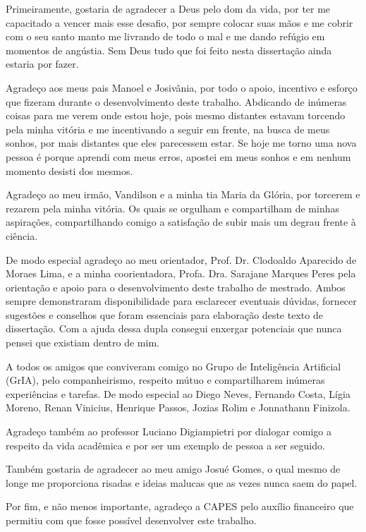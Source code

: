 \begin{agradecimentos} %

Primeiramente, gostaria de agradecer a Deus pelo dom da vida, por ter me capacitado a vencer mais esse desafio, por sempre colocar suas mãos e me cobrir com o seu santo manto me livrando de todo o mal e me dando refúgio em momentos de angústia. Sem Deus tudo que foi feito nesta dissertação ainda estaria por fazer. 

Agradeço aos meus pais Manoel e Josivânia, por todo o apoio, incentivo e esforço que fizeram durante o desenvolvimento deste trabalho. Abdicando de inúmeras coisas para me verem onde estou hoje, pois mesmo distantes estavam torcendo pela minha vitória e me incentivando a seguir em frente, na busca de meus sonhos, por mais distantes que eles parecessem estar. Se hoje me torno uma nova pessoa é porque aprendi com meus erros, apostei em meus sonhos e em nenhum momento desisti dos mesmos.

Agradeço ao meu irmão, Vandilson e a minha tia Maria da Glória, por torcerem e rezarem pela minha vitória. Os quais se orgulham e compartilham de minhas aspirações, compartilhando comigo a satisfação de subir mais um degrau frente à ciência.

De modo especial agradeço ao meu orientador, Prof. Dr. Clodoaldo Aparecido de Moraes Lima, e a minha coorientadora, Profa. Dra. Sarajane Marques Peres pela orientação e apoio para o desenvolvimento deste trabalho de mestrado. Ambos sempre demonstraram disponibilidade para esclarecer eventuais dúvidas, fornecer sugestões e conselhos que foram essenciais para elaboração deste texto de dissertação. Com a ajuda dessa dupla consegui enxergar potenciais que nunca pensei que existiam dentro de mim.

A todos os amigos que conviveram comigo no Grupo de Inteligência Artificial (GrIA), pelo companheirismo, respeito mútuo e compartilharem inúmeras experiências e tarefas. De modo especial ao Diego Neves, Fernando Costa, Lígia Moreno, Renan Vinicius, Henrique Passos, Jozias Rolim e Jonnathann Finizola.

Agradeço também ao professor Luciano Digiampietri por dialogar comigo a respeito da vida acadêmica e por ser um exemplo de pessoa a ser seguido.

Também gostaria de agradecer ao meu amigo Josué Gomes, o qual mesmo de longe me proporciona risadas e ideias malucas que as vezes nunca saem do papel.

Por fim, e não menos importante, agradeço a CAPES pelo auxílio financeiro que permitiu com que fosse possível desenvolver este trabalho.


\end{agradecimentos}


